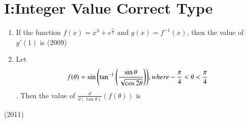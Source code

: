 \documentclass[journal,,12pt,twocolumn]{IEEEtran}
\theoremstyle{remark}
\begin{document}
\section*{I:Integer Value Correct Type}
\begin{enumerate}
    \item If the function $f(x)=x^3+e^{\frac{x}{2}}$ and $g(x)=f^{-1}(x)$, then the value of $g'(1)$ is 
    \hfill{(2009)}\\
    \item    Let \begin{align*}f(\theta)=\sin{\ensuremath{\left(\tan^{-1}{\left(\frac{\sin{\theta}}{\sqrt{\cos{2\theta}}}\right)}\right)}} , where -\frac{\pi}{4}<\theta<\frac{\pi}{4}\end{align*}. Then the value of $\frac{d}{d(\tan{\theta})}(f(\theta))$ is
\end{enumerate}  
\hfill{(2011)}
\end{document}
